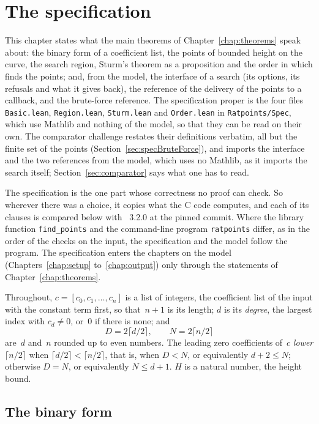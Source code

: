 \chapter{The specification}\label{chap:spec}

This chapter states what the main theorems of Chapter~\ref{chap:theorems} speak about: the binary
form of a coefficient list, the points of bounded height on the curve, the search region, Sturm's
theorem as a proposition and the order in which \ratpoints{} finds the points; and, from the model, the
interface of a search (its options, its refusals and what it gives back), the reference of the
delivery of the points to a callback, and the brute-force reference. The specification proper is
the four files \verb|Basic.lean|, \verb|Region.lean|, \verb|Sturm.lean| and \verb|Order.lean| in
\verb|Ratpoints/Spec|, which use Mathlib and nothing of the model, so that they can be read on their
own. The comparator challenge restates their definitions verbatim, all but the finite set of the
points (Section~\ref{sec:specBruteForce}), and imports the interface and the two references from the
model, which uses no Mathlib, as it imports the search itself; Section~\ref{sec:comparator} says
what one has to read.

The specification is the one part whose correctness no proof can check. So wherever there was a
choice, it copies what the C code computes, and each of its clauses is compared below with
\ratpoints{}~3.2.0 at the pinned commit. Where the library function \verb|find_points| and the
command-line program \verb|ratpoints| differ, as in the order of the checks on the input, the
specification and the model follow the program. The specification enters the chapters on the model
(Chapters~\ref{chap:setup} to~\ref{chap:output}) only through the statements of
Chapter~\ref{chap:theorems}.

Throughout, $c = [c_0, c_1, \dots, c_n]$ is a list of integers, the coefficient list of the input
with the constant term first, so that~$n + 1$ is its length; $d$ is its \emph{degree}, the largest
index with $c_d \ne 0$, or~$0$ if there is none; and
\[ D = 2 \lceil d/2 \rceil, \qquad N = 2 \lceil n/2 \rceil \]
are~$d$ and~$n$ rounded up to even numbers. The leading zero coefficients of~$c$ \emph{lower
$\lceil n/2 \rceil$} when $\lceil d/2 \rceil < \lceil n/2 \rceil$, that is, when $D < N$, or
equivalently $d + 2 \le N$; otherwise $D = N$, or equivalently $N \le d + 1$. $H$ is a natural
number, the height bound.

\section{The binary form}\label{sec:specBinaryForm}

